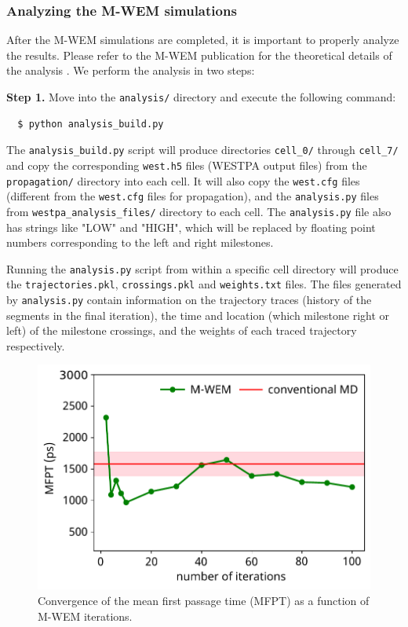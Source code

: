 \subsubsection{Analyzing the M-WEM simulations} After the M-WEM simulations are completed, it is important to properly analyze the results. 
Please refer to the M-WEM publication for the theoretical details of the analysis \cite{Ray2022Markovian}. 
We perform the analysis in two steps:

\textbf{Step 1.} Move into the \verb|analysis/| directory and execute the following command: 

\begin{verbatim}
  $ python analysis_build.py 
\end{verbatim}

The \verb|analysis_build.py| script will produce directories \verb|cell_0/| through \verb|cell_7/| and copy the corresponding \verb|west.h5| files (WESTPA output files) from the \verb|propagation/| directory into each cell. 
It will also copy the \verb|west.cfg| files (different from the \verb|west.cfg| files for propagation), and the \verb|analysis.py| files from \verb|westpa_analysis_files/| directory to each cell. 
The \verb|analysis.py| file also has strings like "LOW" and "HIGH", which will be replaced by floating point numbers corresponding to the left and right milestones.

Running the \verb|analysis.py| script from within a specific cell directory will produce the \verb|trajectories.pkl|, \verb|crossings.pkl| and \verb|weights.txt| files. 
The files generated by \verb|analysis.py| contain information on the trajectory traces (history of the segments in the final iteration), the time and location (which milestone right or left) of the milestone crossings, and the weights of each traced trajectory respectively.


\begin{figure}[t]
\centering
\includegraphics[width=\columnwidth]{figures/Figure10_MFPT.pdf}
\caption{Convergence of the mean first passage time (MFPT) as a function of M-WEM iterations.}
\label{fig:mwem-mfpt}
\end{figure}


